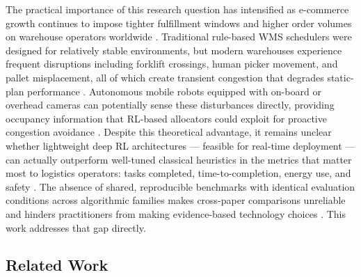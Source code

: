 \documentclass[conference]{IEEEtran}
\begin{document}
The practical importance of this research question has intensified as e-commerce growth continues to impose tighter fulfillment windows and higher order volumes on warehouse operators worldwide \cite{moons2019integrating}.
Traditional rule-based WMS schedulers were designed for relatively stable environments, but modern warehouses experience frequent disruptions including forklift crossings, human picker movement, and pallet misplacement, all of which create transient congestion that degrades static-plan performance \cite{fragapane2021planning}.
Autonomous mobile robots equipped with on-board or overhead cameras can potentially sense these disturbances directly, providing occupancy information that RL-based allocators could exploit for proactive congestion avoidance \cite{open2021autonomous}.
Despite this theoretical advantage, it remains unclear whether lightweight deep RL architectures --- feasible for real-time deployment --- can actually outperform well-tuned classical heuristics in the metrics that matter most to logistics operators: tasks completed, time-to-completion, energy use, and safety \cite{zhang2021robot}.
The absence of shared, reproducible benchmarks with identical evaluation conditions across algorithmic families makes cross-paper comparisons unreliable and hinders practitioners from making evidence-based technology choices \cite{gu2017deep}.
This work addresses that gap directly.

\subsection{Related Work}
\end{document}
